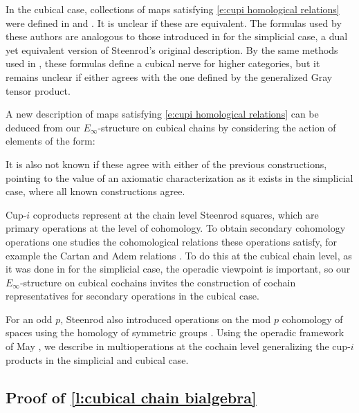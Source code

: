 In the cubical case, collections of maps satisfying \eqref{e:cupi homological relations} were defined in \cite{kadeishvili1999coproducts} and \cite{pilarczyk2016cubical}.
It is unclear if these are equivalent.
The formulas used by these authors are analogous to those introduced in \cite{medina2021fast_sq} for the simplicial case, a dual yet equivalent version of Steenrod's original description.
By the same methods used in \cite{medina2020globular}, these formulas define a cubical nerve for higher categories, but it remains unclear if either agrees with the one defined by the generalized Gray tensor product.

A new description of maps satisfying \eqref{e:cupi homological relations} can be deduced from our $E_\infty$-structure on cubical chains by considering the action of elements of the form:
\begin{center}
	
\end{center}
It is also not known if these agree with either of the previous constructions, pointing to the value of an axiomatic characterization as it exists in the simplicial case, where all known constructions agree.

Cup-$i$ coproducts represent at the chain level Steenrod squares, which are primary operations at the level of cohomology.
To obtain secondary cohomology operations one studies the cohomological relations these operations satisfy, for example the Cartan and Adem relations \cite{steenrod1962cohomology}.
To do this at the cubical chain level, as it was done in \cite{medina2020cartan,medina2021adem} for the simplicial case, the operadic viewpoint is important, so our $E_\infty$-structure on cubical cochains invites the construction of cochain representatives for secondary operations in the cubical case.

For an odd $p$, Steenrod also introduced operations on the mod $p$ cohomology of spaces using the homology of symmetric groups \cite{steenrod1952reduced, steenrod1953cyclic}.
Using the operadic framework of May \cite{may1970general}, we describe in \cite{medina2021may_st} multioperations at the cochain level generalizing the cup-$i$ products in the simplicial and cubical case.

\subsection{Proof of \cref{l:cubical chain bialgebra}} \label{ss:proof action}

